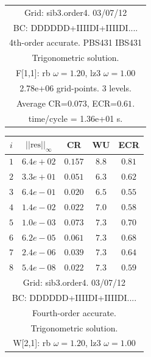 \begin{table}[hbt]
\begin{center}
{\begin{tabular}{|c|c|c|c|c|}
\hline 
\multicolumn{5}{|c|}{Grid: sib3.order4. 03/07/12}  \\
\multicolumn{5}{|c|}{BC: DDDDDD+IIIIDI+IIIIDI....}  \\
\multicolumn{5}{|c|}{4th-order accurate. PBS431 IBS431}  \\
\multicolumn{5}{|c|}{Trigonometric solution.}  \\
\multicolumn{5}{|c|}{F[1,1]: rb $\omega=1.20$, lz3 $\omega=1.00$}  \\
\multicolumn{5}{|c|}{2.78e+06 grid-points. 3 levels.}  \\
\multicolumn{5}{|c|}{Average CR=$0.073$, ECR=$0.61$.}  \\
\multicolumn{5}{|c|}{time/cycle = 1.36e+01 s.}  \\
\hline 
\end{tabular}
\begin{tabular}{|c|c|c|c|c|} \hline 
 $i$   & $\vert\vert\mbox{res}\vert\vert_\infty$  &  CR     &  WU    & ECR  \\   \hline 
 $ 1$  & $ 6.4e+02$ & $0.157$ & $ 8.8$ & $0.81$ \\ 
 $ 2$  & $ 3.3e+01$ & $0.051$ & $ 6.3$ & $0.62$ \\ 
 $ 3$  & $ 6.4e-01$ & $0.020$ & $ 6.5$ & $0.55$ \\ 
 $ 4$  & $ 1.4e-02$ & $0.022$ & $ 7.0$ & $0.58$ \\ 
 $ 5$  & $ 1.0e-03$ & $0.073$ & $ 7.3$ & $0.70$ \\ 
 $ 6$  & $ 6.2e-05$ & $0.061$ & $ 7.3$ & $0.68$ \\ 
 $ 7$  & $ 2.4e-06$ & $0.039$ & $ 7.3$ & $0.64$ \\ 
 $ 8$  & $ 5.4e-08$ & $0.022$ & $ 7.3$ & $0.59$ \\ 
\hline 
\multicolumn{5}{|c|}{Grid: sib3.order4. 03/07/12}  \\
\multicolumn{5}{|c|}{BC: DDDDDD+IIIIDI+IIIIDI....}  \\
\multicolumn{5}{|c|}{Fourth-order accurate.}  \\
\multicolumn{5}{|c|}{Trigonometric solution.}  \\
\multicolumn{5}{|c|}{W[2,1]: rb $\omega=1.20$, lz3 $\omega=1.00$}  \\

\end{tabular}}
\end{center}
\end{table}
